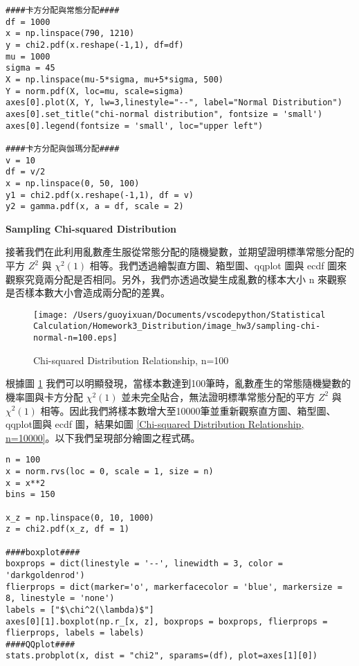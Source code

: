 \bigskip
\begin{lstlisting}
####卡方分配與常態分配####
df = 1000
x = np.linspace(790, 1210) 
y = chi2.pdf(x.reshape(-1,1), df=df)
mu = 1000
sigma = 45
X = np.linspace(mu-5*sigma, mu+5*sigma, 500) 
Y = norm.pdf(X, loc=mu, scale=sigma)
axes[0].plot(X, Y, lw=3,linestyle="--", label="Normal Distribution") 
axes[0].set_title("chi-normal distribution", fontsize = 'small')
axes[0].legend(fontsize = 'small', loc="upper left")

####卡方分配與伽瑪分配####
v = 10
df = v/2
x = np.linspace(0, 50, 100)
y1 = chi2.pdf(x.reshape(-1,1), df = v)
y2 = gamma.pdf(x, a = df, scale = 2)
\end{lstlisting}

\textbf{Sampling Chi-squared Distribution}

接著我們在此利用亂數產生服從常態分配的隨機變數，並期望證明標準常態分配的平方 $Z^2$ 與 $\chi^2(1)$ 相等。我們透過繪製直方圖、箱型圖、qqplot 圖與 ecdf 圖來觀察究竟兩分配是否相同。另外，我們亦透過改變生成亂數的樣本大小 n 來觀察是否樣本數大小會造成兩分配的差異。

\begin{figure}[H]
    \centering
        \texttt{[image: /Users/guoyixuan/Documents/vscodepython/Statistical Calculation/Homework3\_Distribution/image\_hw3/sampling-chi-normal-n=100.eps]}
    \caption{Chi-squared Distribution Relationship, n=100}
    \label{Chi-squared Distribution Relationship, n=100}
\end{figure}



根據圖 \ref{Chi-squared Distribution Relationship, n=100} 我們可以明顯發現，當樣本數達到100筆時，亂數產生的常態隨機變數的機率圖與卡方分配 $\chi^2(1)$ 並未完全貼合，無法證明標準常態分配的平方 $Z^2$ 與 $\chi^2(1)$ 相等。因此我們將樣本數增大至10000筆並重新觀察直方圖、箱型圖、qqplot圖與 ecdf 圖，結果如圖 \ref{Chi-squared Distribution Relationship, n=10000}。以下我們呈現部分繪圖之程式碼。

\bigskip
\begin{lstlisting}
n = 100
x = norm.rvs(loc = 0, scale = 1, size = n)
x = x**2
bins = 150

x_z = np.linspace(0, 10, 1000)
z = chi2.pdf(x_z, df = 1)

####boxplot####
boxprops = dict(linestyle = '--', linewidth = 3, color = 'darkgoldenrod')
flierprops = dict(marker='o', markerfacecolor = 'blue', markersize = 8, linestyle = 'none') 
labels = ["$\chi^2(\lambda)$"]
axes[0][1].boxplot(np.r_[x, z], boxprops = boxprops, flierprops = flierprops, labels = labels)
####QQplot####
stats.probplot(x, dist = "chi2", sparams=(df), plot=axes[1][0])
\end{lstlisting}

